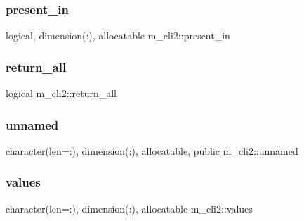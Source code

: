 \subsubsection{\texorpdfstring{present\+\_\+in}{present\_in}}
{\footnotesize\ttfamily logical, dimension(\+:), allocatable m\+\_\+cli2\+::present\+\_\+in\hspace{0.3cm}{\ttfamily [private]}}

\mbox{\label{namespacem__cli2_abbcd01a5c2a1e6030d09f3a5dbe1fa45}} 
\subsubsection{\texorpdfstring{return\+\_\+all}{return\_all}}
{\footnotesize\ttfamily logical m\+\_\+cli2\+::return\+\_\+all\hspace{0.3cm}{\ttfamily [private]}}

\mbox{\label{namespacem__cli2_a5b03781cb432174f4ee8d734ecbb9604}} 
\subsubsection{\texorpdfstring{unnamed}{unnamed}}
{\footnotesize\ttfamily character(len=\+:), dimension(\+:), allocatable, public m\+\_\+cli2\+::unnamed}

\mbox{\label{namespacem__cli2_af631ee3a1bca98e9fbf1f80646dae360}} 
\subsubsection{\texorpdfstring{values}{values}}
{\footnotesize\ttfamily character(len=\+:), dimension(\+:), allocatable m\+\_\+cli2\+::values\hspace{0.3cm}{\ttfamily [private]}}

